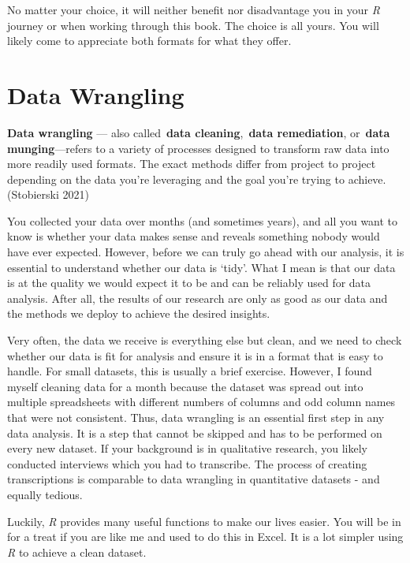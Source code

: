 \documentclass[
  letterpaper,
]{krantz}
\renewenvironment{quote}{\begin{VF}}{\end{VF}}
\begin{document}
No matter your choice, it will neither benefit nor disadvantage you in
your \emph{R} journey or when working through this book. The choice is
all yours. You will likely come to appreciate both formats for what they
offer.


\chapter{Data Wrangling}\label{sec-data-wrangling}

\begin{quote}
\textbf{Data wrangling} --- also called~\textbf{data
cleaning},~\textbf{data remediation}, or~\textbf{data munging}---refers
to a variety of processes designed to transform raw data into more
readily used formats. The exact methods differ from project to project
depending on the data you're leveraging and the goal you're trying to
achieve. (Stobierski 2021)
\end{quote}

You collected your data over months (and sometimes years), and all you
want to know is whether your data makes sense and reveals something
nobody would have ever expected. However, before we can truly go ahead
with our analysis, it is essential to understand whether our data is
`tidy'. What I mean is that our data is at the quality we would expect
it to be and can be reliably used for data analysis. After all, the
results of our research are only as good as our data and the methods we
deploy to achieve the desired insights.

Very often, the data we receive is everything else but clean, and we
need to check whether our data is fit for analysis and ensure it is in a
format that is easy to handle. For small datasets, this is usually a
brief exercise. However, I found myself cleaning data for a month
because the dataset was spread out into multiple spreadsheets with
different numbers of columns and odd column names that were not
consistent. Thus, data wrangling is an essential first step in any data
analysis. It is a step that cannot be skipped and has to be performed on
every new dataset. If your background is in qualitative research, you
likely conducted interviews which you had to transcribe. The process of
creating transcriptions is comparable to data wrangling in quantitative
datasets - and equally tedious.

Luckily, \emph{R} provides many useful functions to make our lives
easier. You will be in for a treat if you are like me and used to do
this in Excel. It is a lot simpler using \emph{R} to achieve a clean
dataset.
\end{document}

